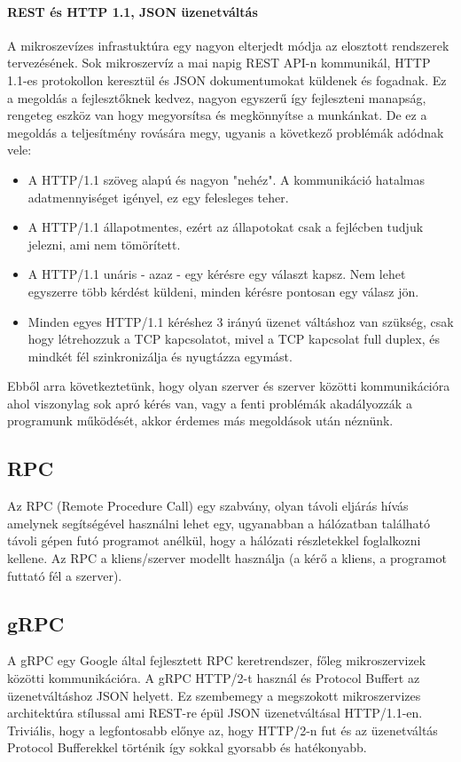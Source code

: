 \paragraph{REST és HTTP 1.1, JSON üzenetváltás}
A mikroszevízes infrastuktúra egy nagyon elterjedt módja az elosztott rendszerek tervezésének.
Sok mikroszervíz a mai napig REST API-n kommunikál, HTTP 1.1-es protokollon keresztül és JSON dokumentumokat küldenek és fogadnak.
Ez a megoldás a fejlesztőknek kedvez, nagyon egyszerű így fejleszteni manapság, rengeteg eszköz van hogy megyorsítsa és megkönnyítse a munkánkat.
De ez a megoldás a teljesítmény rovására megy, ugyanis a következő problémák adódnak vele:
\begin{itemize}
    \item A HTTP/1.1  szöveg alapú és nagyon "nehéz". A kommunikáció hatalmas adatmennyiséget igényel, ez egy felesleges teher.
    \item A HTTP/1.1  állapotmentes, ezért az állapotokat csak a fejlécben tudjuk jelezni, ami nem tömörített.
    \item A HTTP/1.1  unáris - azaz - egy kérésre egy választ kapsz. Nem lehet egyszerre több kérdést küldeni, minden kérésre pontosan egy válasz jön.
    \item Minden egyes HTTP/1.1 kéréshez 3 irányú üzenet váltáshoz van szükség, csak hogy létrehozzuk a TCP kapcsolatot, mivel a TCP kapcsolat full duplex, és mindkét fél szinkronizálja és nyugtázza egymást.
\end{itemize}
Ebből arra következtetünk, hogy olyan szerver és szerver közötti kommunikációra ahol viszonylag sok apró kérés van, vagy a fenti problémák
akadályozzák a programunk működését, akkor érdemes más megoldások után néznünk.

\subsection{RPC}
Az RPC \cite{RPC} (Remote Procedure Call) egy szabvány, olyan távoli eljárás hívás amelynek segítségével használni lehet egy, ugyanabban a hálózatban található távoli gépen futó programot anélkül, hogy a hálózati részletekkel foglalkozni kellene.
Az RPC a kliens/szerver modellt használja (a kérő a kliens, a programot futtató fél a szerver).

\subsection{gRPC}
A gRPC \cite{gRPC} egy Google által fejlesztett RPC keretrendszer, főleg mikroszervizek közötti kommunikációra.
A gRPC HTTP/2-t használ és Protocol Buffert az üzenetváltáshoz JSON helyett. Ez szembemegy a megszokott mikroszervizes architektúra stílussal ami REST-re épül JSON üzenetváltásal HTTP/1.1-en.
Triviális, hogy a legfontosabb előnye az, hogy HTTP/2-n fut és az üzenetváltás Protocol Bufferekkel történik így sokkal gyorsabb és hatékonyabb.



